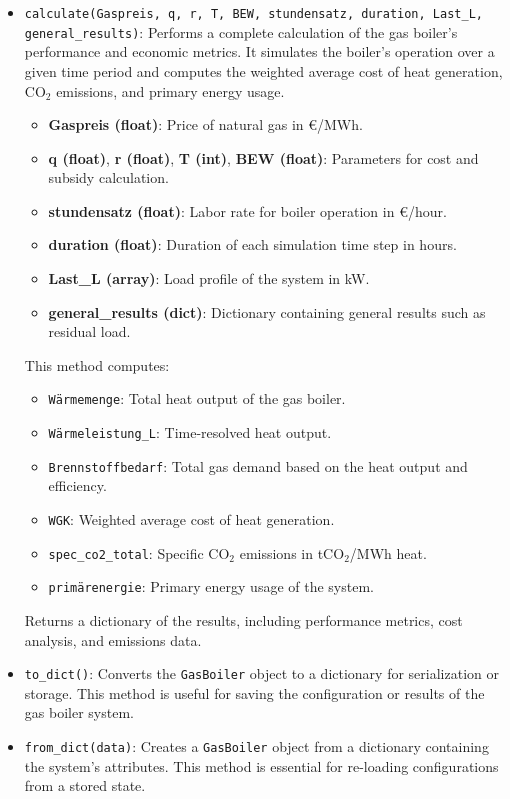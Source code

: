 \begin{itemize}
    \item \texttt{calculate(Gaspreis, q, r, T, BEW, stundensatz, duration, Last\_L, general\_results)}:
    Performs a complete calculation of the gas boiler's performance and economic metrics. It simulates the boiler's operation over a given time period and computes the weighted average cost of heat generation, CO$_2$ emissions, and primary energy usage.
    \begin{itemize}
        \item \textbf{Gaspreis (float)}: Price of natural gas in €/MWh.
        \item \textbf{q (float)}, \textbf{r (float)}, \textbf{T (int)}, \textbf{BEW (float)}: Parameters for cost and subsidy calculation.
        \item \textbf{stundensatz (float)}: Labor rate for boiler operation in €/hour.
        \item \textbf{duration (float)}: Duration of each simulation time step in hours.
        \item \textbf{Last\_L (array)}: Load profile of the system in kW.
        \item \textbf{general\_results (dict)}: Dictionary containing general results such as residual load.
    \end{itemize}
    This method computes:
    \begin{itemize}
        \item \texttt{Wärmemenge}: Total heat output of the gas boiler.
        \item \texttt{Wärmeleistung\_L}: Time-resolved heat output.
        \item \texttt{Brennstoffbedarf}: Total gas demand based on the heat output and efficiency.
        \item \texttt{WGK}: Weighted average cost of heat generation.
        \item \texttt{spec\_co2\_total}: Specific CO$_2$ emissions in tCO$_2$/MWh heat.
        \item \texttt{primärenergie}: Primary energy usage of the system.
    \end{itemize}
    Returns a dictionary of the results, including performance metrics, cost analysis, and emissions data.

    \item \texttt{to\_dict()}: 
    Converts the \texttt{GasBoiler} object to a dictionary for serialization or storage. This method is useful for saving the configuration or results of the gas boiler system.

    \item \texttt{from\_dict(data)}:
    Creates a \texttt{GasBoiler} object from a dictionary containing the system's attributes. This method is essential for re-loading configurations from a stored state.
\end{itemize}

